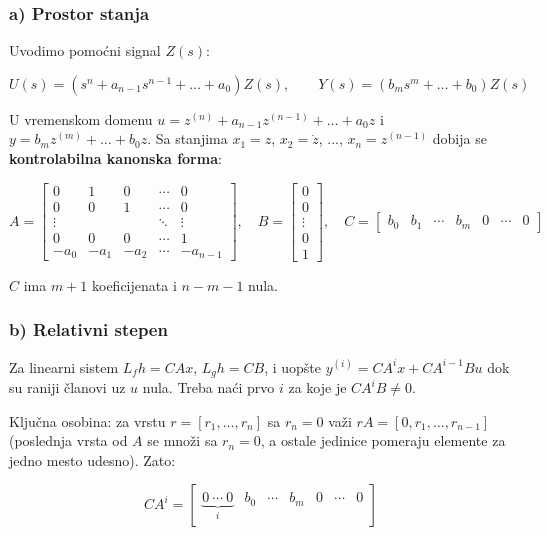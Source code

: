 \documentclass[11pt,a4paper,parskip=half,headsepline,numbers=noenddot]{scrartcl}
\begin{document}
\subsubsection{a) Prostor stanja}

Uvodimo pomoćni signal \(Z(s)\):

\[U(s) = \left(s^n + a_{n-1}s^{n-1} + \dots + a_0\right)Z(s), \qquad Y(s) = \left(b_ms^m + \dots + b_0\right)Z(s)\]

U vremenskom domenu \(u = z^{(n)} + a_{n-1}z^{(n-1)} + \dots + a_0z\) i \(y = b_mz^{(m)} + \dots + b_0z\). Sa stanjima \(x_1 = z\), \(x_2 = \dot z\), ..., \(x_n = z^{(n-1)}\) dobija se \textbf{kontrolabilna kanonska forma}:

\[
A = \begin{bmatrix}
0 & 1 & 0 & \cdots & 0 \\
0 & 0 & 1 & \cdots & 0 \\
\vdots & & & \ddots & \vdots \\
0 & 0 & 0 & \cdots & 1 \\
-a_0 & -a_1 & -a_2 & \cdots & -a_{n-1}
\end{bmatrix}, \quad
B = \begin{bmatrix} 0 \\ 0 \\ \vdots \\ 0 \\ 1 \end{bmatrix}, \quad
C = \begin{bmatrix} b_0 & b_1 & \cdots & b_m & 0 & \cdots & 0 \end{bmatrix}
\]

\(C\) ima \(m + 1\) koeficijenata i \(n - m - 1\) nula.

\subsubsection{b) Relativni stepen}

Za linearni sistem \(L_fh = CAx\), \(L_gh = CB\), i uopšte \(y^{(i)} = CA^ix + CA^{i-1}Bu\) dok su raniji članovi uz \(u\) nula. Treba naći prvo \(i\) za koje je \(CA^{i}B \ne 0\).

Ključna osobina: za vrstu \(r = [r_1, \dots, r_n]\) sa \(r_n = 0\) važi \(rA = [0, r_1, \dots, r_{n-1}]\) (poslednja vrsta od \(A\) se množi sa \(r_n = 0\), a ostale jedinice pomeraju elemente za jedno mesto udesno). Zato:

\[CA^i = \begin{bmatrix} \underbrace{0 \ \cdots\ 0}_{i} & b_0 & \cdots & b_m & 0 & \cdots & 0 \end{bmatrix}\]
\end{document}
